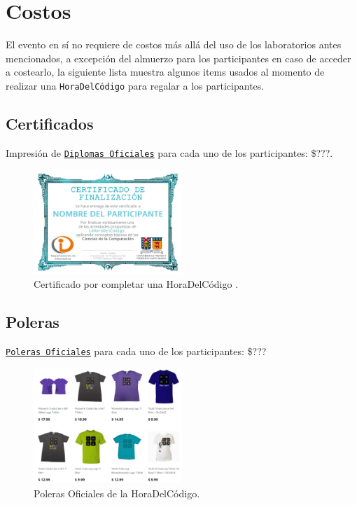 \documentclass[letterpaper,12pt]{article}
\begin{document}
\section{Costos}

El evento en sí no requiere de costos más allá del uso de los laboratorios antes mencionados, a excepción del almuerzo para los participantes en caso de acceder a costearlo, la siguiente lista muestra algunos items usados al momento de realizar una \texttt{HoraDelCódigo} para regalar a los participantes.


\subsection{Certificados}

Impresión de \texttt{\href{https://code.org/certificates}{Diplomas Oficiales}} para cada uno de los participantes: \$???.

\begin{figure}[H]
  \centering
    \includegraphics[width=0.5\textwidth]{diploma}
  \caption{Certificado por completar una HoraDelCódigo .}
\end{figure}

\subsection{Poleras}

\texttt{\href{https://store.code.org/collections/all?page=2}{Poleras Oficiales}} para cada uno de los participantes: \$???

\begin{figure}[H]
  \centering
    \includegraphics[width=0.5\textwidth]{poleras}
  \caption{Poleras Oficiales de la HoraDelCódigo.}
\end{figure}
\end{document}

